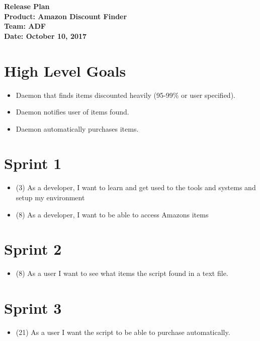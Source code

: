 \documentclass[11pt]{article}
\begin{document}
	\Large{\textbf{Release Plan}}\\
	\Large{\textbf{Product: Amazon Discount Finder}}\\
	\Large{\textbf{Team: ADF}}\\
	\Large{\textbf{Date: October 10, 2017}}\\
	
	\vspace{-3mm}
	
	\section*{High Level Goals}
		\vspace{-3mm}
		\begin{itemize}
			\item Daemon that finds items discounted heavily (95-99\% or user specified).
			\item Daemon notifies user of items found.
			\item Daemon automatically purchases items.
		\end{itemize}
	\section*{Sprint 1}
		\vspace{-3mm}
		\begin{itemize}
		    \item (3) As a developer, I want to learn and get used to the tools and systems and setup my environment
		    \item (8) As a developer, I want to be able to access Amazons items
		\end{itemize}
	\section*{Sprint 2}
	    \vspace{-3mm}
	    \begin{itemize}
		    \item (8) As a user I want to see what items the script found in a text file.
		\end{itemize}
	\section*{Sprint 3}
	    \vspace{-3mm}
	    \begin{itemize}
		    \item (21) As a user I want the script to be able to purchase automatically. 
		\end{itemize}	
\end{document}

